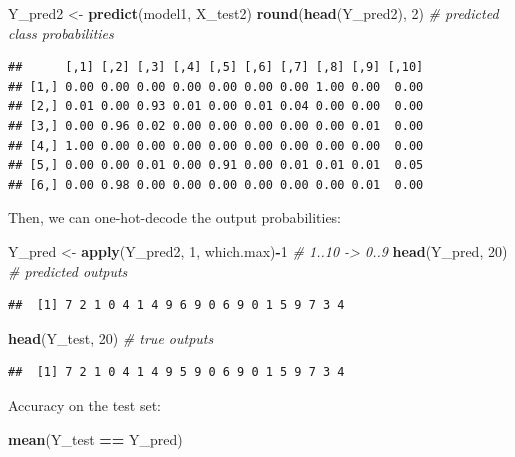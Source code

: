 \documentclass[10pt,b5paper,krantz1]{krantz}
\newenvironment{Shaded}{\begin{snugshade}}{\end{snugshade}}
\newcommand{\CommentTok}[1]{\textcolor[rgb]{0.37,0.37,0.37}{\textit{#1}}}
\newcommand{\DecValTok}[1]{\textcolor[rgb]{0.06,0.06,0.06}{#1}}
\newcommand{\KeywordTok}[1]{\textcolor[rgb]{0.27,0.27,0.27}{\textbf{#1}}}
\newcommand{\NormalTok}[1]{#1}
\newcommand{\OperatorTok}[1]{\textcolor[rgb]{0.43,0.43,0.43}{\textbf{#1}}}
\newcommand{\StringTok}[1]{\textcolor[rgb]{0.5,0.5,0.5}{#1}}
\begin{document}
\begin{Shaded}
\begin{Highlighting}[]
\NormalTok{Y_pred2 <-}\StringTok{ }\KeywordTok{predict}\NormalTok{(model1, X_test2)}
\KeywordTok{round}\NormalTok{(}\KeywordTok{head}\NormalTok{(Y_pred2), }\DecValTok{2}\NormalTok{) }\CommentTok{# predicted class probabilities}
\end{Highlighting}
\end{Shaded}

\begin{verbatim}
##      [,1] [,2] [,3] [,4] [,5] [,6] [,7] [,8] [,9] [,10]
## [1,] 0.00 0.00 0.00 0.00 0.00 0.00 0.00 1.00 0.00  0.00
## [2,] 0.01 0.00 0.93 0.01 0.00 0.01 0.04 0.00 0.00  0.00
## [3,] 0.00 0.96 0.02 0.00 0.00 0.00 0.00 0.00 0.01  0.00
## [4,] 1.00 0.00 0.00 0.00 0.00 0.00 0.00 0.00 0.00  0.00
## [5,] 0.00 0.00 0.01 0.00 0.91 0.00 0.01 0.01 0.01  0.05
## [6,] 0.00 0.98 0.00 0.00 0.00 0.00 0.00 0.00 0.01  0.00
\end{verbatim}

Then, we can one-hot-decode the output probabilities:

\begin{Shaded}
\begin{Highlighting}[]
\NormalTok{Y_pred <-}\StringTok{ }\KeywordTok{apply}\NormalTok{(Y_pred2, }\DecValTok{1}\NormalTok{, which.max)}\OperatorTok{-}\DecValTok{1} \CommentTok{# 1..10 -> 0..9}
\KeywordTok{head}\NormalTok{(Y_pred, }\DecValTok{20}\NormalTok{) }\CommentTok{# predicted outputs}
\end{Highlighting}
\end{Shaded}

\begin{verbatim}
##  [1] 7 2 1 0 4 1 4 9 6 9 0 6 9 0 1 5 9 7 3 4
\end{verbatim}

\begin{Shaded}
\begin{Highlighting}[]
\KeywordTok{head}\NormalTok{(Y_test, }\DecValTok{20}\NormalTok{) }\CommentTok{# true outputs}
\end{Highlighting}
\end{Shaded}

\begin{verbatim}
##  [1] 7 2 1 0 4 1 4 9 5 9 0 6 9 0 1 5 9 7 3 4
\end{verbatim}

Accuracy on the test set:

\begin{Shaded}
\begin{Highlighting}[]
\KeywordTok{mean}\NormalTok{(Y_test }\OperatorTok{==}\StringTok{ }\NormalTok{Y_pred)}
\end{Highlighting}
\end{Shaded}
\end{document}
